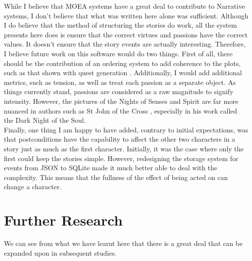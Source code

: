 \documentclass[12pt]{article}
\begin{document}
While I believe that MOEA systems have a great deal to contribute to Narrative systems, I don't believe that what was written here alone was sufficient. Although I do believe that the method of structuring the stories do work, all the system presents here does is ensure that the correct virtues and passions have the correct values. It doesn't ensure that the story events are actually interesting. Therefore, I believe future work on this software would do two things. First of all, there should be the contribution of an ordering system to add coherence to the plots, such as that shown with quest generation \cite{questgeneration}. Additionally, I would add additional metrics, such as tension, as well as treat each passion as a separate object. As things currently stand, passions are considered as a raw magnitude to signify intensity. However, the pictures of the Nights of Senses and Spirit are far more nuanced in authors such as St John of the Cross \cite{OperaOmniaStJohnOfTheCross}, especially in his work called the Dark Night of the Soul. \\

Finally, one thing I am happy to have added, contrary to initial expectations, was that postconditions have the capability to affect the other two characters in a story just as much as the first character. Initially, it was the case where only the first could keep the stories simple. However, redesigning the storage system for events from JSON to SQLite made it much better able to deal with the complexity. This means that the fullness of the effect of being acted on can change a character. \\

\section{Further Research}
We can see from what we have learnt here that there is a great deal that can be expanded upon in subsequent studies. 
\end{document}

